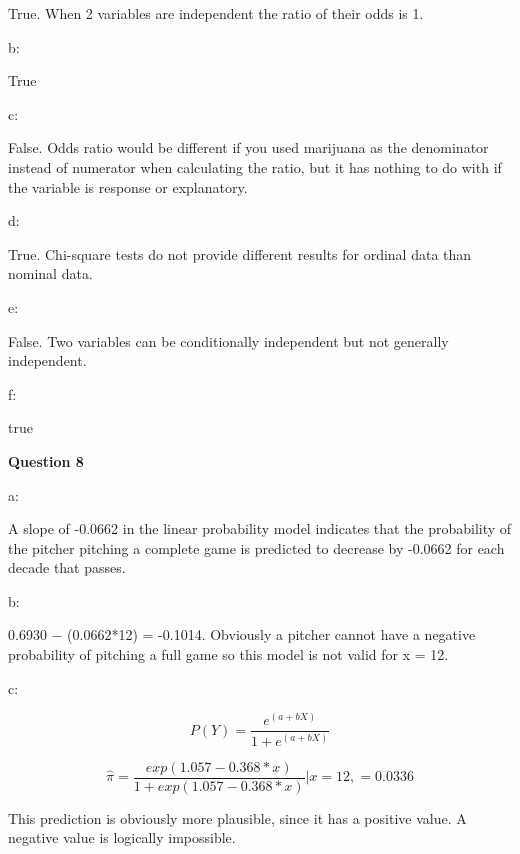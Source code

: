 \documentclass[
]{article}
\begin{document}
True. When 2 variables are independent the ratio of their odds is 1.

b:

True

c:

False. Odds ratio would be different if you used marijuana as the
denominator instead of numerator when calculating the ratio, but it has
nothing to do with if the variable is response or explanatory.

d:

True. Chi-square tests do not provide different results for ordinal data
than nominal data.

e:

False. Two variables can be conditionally independent but not generally
independent.

f:

true

\textbf{Question 8}

a:

A slope of -0.0662 in the linear probability model indicates that the
probability of the pitcher pitching a complete game is predicted to
decrease by -0.0662 for each decade that passes.

b:

0.6930 − (0.0662*12) = -0.1014. Obviously a pitcher cannot have a
negative probability of pitching a full game so this model is not valid
for x = 12.

c:

\[P(Y) = \frac{e^(a+bX)}{1+e^(a+bX)}\]

\[\hat{\pi} = \frac{exp(1.057-0.368*x)}{1+exp(1.057-0.368*x)} | x = 12, = 0.0336\]

This prediction is obviously more plausible, since it has a positive
value. A negative value is logically impossible.
\end{document}
